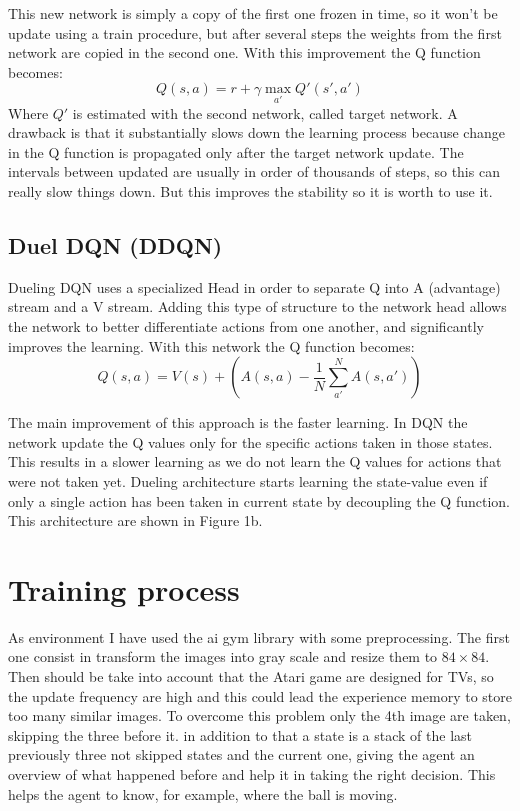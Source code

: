 \documentclass[10pt]{article}
\begin{document}
\begin{multicols}{2}
This new network is simply a copy of the first one frozen in time, so it won't be update using a train procedure, but after several steps the weights from the first network are copied in the second one. With this improvement the Q function becomes: 
\[
Q(s, a) = r + \gamma \max_{a'} Q'(s', a') 
\]
Where $Q'$ is estimated with the second network, called target network.
A drawback is that it substantially slows down the learning process because change in the Q function is propagated only after the target network update. The intervals between updated are usually in order of thousands of steps, so this can really slow things down. But this improves the stability so it is worth to use it.

\subsection{Duel DQN (DDQN)}
Dueling DQN uses a specialized Head in order to separate Q into A (advantage) stream and a V stream. Adding this type of structure to the network head allows the network to better differentiate actions from one another, and significantly improves the learning. With this network the Q function becomes: 
\[
Q(s, a) = V(s) + (A(s, a) - \frac{1}{N} \sum_{a'}^{N} A(s, a'))
\]

The main improvement of this approach is the faster learning. In DQN the network update the Q values only for the specific actions taken in those states. This results in a slower learning as we do not learn the Q values for actions that were not taken yet. Dueling architecture starts learning the state-value even if only a single action has been taken in current state by decoupling the Q function. This architecture are shown in Figure 1b. 

\section{Training process}

As environment I have used the ai gym library with some preprocessing. The first one consist in transform the images into gray scale and resize them to $84\times84$. Then should be take into account that the Atari game are designed for TVs, so the update frequency are high and this could lead the experience memory to store too many similar images. To overcome this problem only the 4th image are taken, skipping the three before it. in addition to that a state is a stack of the last previously three not skipped states and the current one, giving the agent an overview of what happened before and help it in taking the right decision. This helps the agent to know, for example, where the ball is moving.


\end{multicols}
\end{document}
